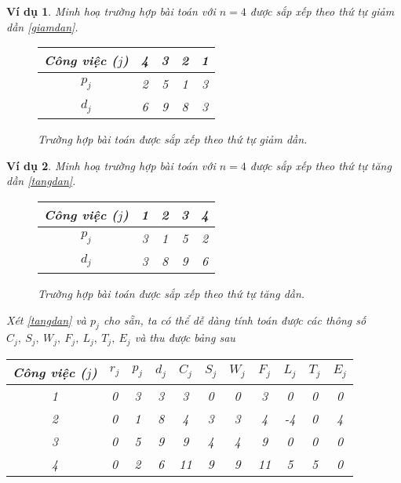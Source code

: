 \documentclass[12pt,a4paper]{report}
\newtheorem{vd}{Ví dụ}
\begin{document}
\begin{vd}
	Minh hoạ trường hợp bài toán với $n=4$ được sắp xếp theo thứ tự giảm dần \eqref{giamdan}.
	
	\begin{figure}[h!]
	\centering
	\begin{tabular}{|c | c c c c |} 
		\hline
		Công việc ($j$) & 4 & 3 & 2 & 1 \\
		\hline\hline
		$p_j$ & 2 & 5 & 1 & 3 \\
		$d_j$ & 6 & 9 & 8 & 3 \\
		\hline
	\end{tabular}
	\caption{\label{giamdan} Trường hợp bài toán được sắp xếp theo thứ tự giảm dần.}
	\end{figure}
\end{vd}
	
\begin{vd}
	Minh hoạ trường hợp bài toán với $n=4$ được sắp xếp theo thứ tự tăng dần \eqref{tangdan}.
	\begin{figure}[h!]
	\centering
	\begin{tabular}{|c | c c c c |} 
		\hline
		Công việc ($j$) & 1 & 2 & 3 & 4 \\
		\hline\hline
		$p_j$ & 3 & 1 & 5 & 2 \\
		$d_j$ & 3 & 8 & 9 & 6 \\
		\hline
	\end{tabular}
	\caption{\label{tangdan} Trường hợp bài toán được sắp xếp theo thứ tự tăng dần.}
	\end{figure}

	Xét \eqref{tangdan} và $p_j$ cho sẵn, ta có thể dễ dàng tính toán được các thông số $C_j, \: S_j, \: W_j, \: F_j, \: L_j, \: T_j, \: E_j$ và thu được bảng sau
\begin{table}[h!]
		\centering
		 \begin{tabular}{|c || c c c c c c c c c c|}
		 \hline
		 Công việc ($j$) & $r_j$ & $p_j$ & $d_j$ & $C_j$ & $S_j$ & $W_j$ & $F_j$ & $L_j$ & $T_j$ & $E_j$ \\
		 \hline
		 1 & 0 & 3 & 3 & 3 & 0 & 0 & 3 & 0 & 0 & 0 \\
		 \hline
		 2 & 0 & 1 & 8 & 4 & 3 & 3 & 4 & -4 & 0 & 4 \\
		 \hline
		 3 & 0 & 5 & 9 & 9 & 4 & 4 & 9 & 0 & 0 & 0 \\
		 \hline
		 4 & 0 & 2 & 6 & 11 & 9 & 9 & 11 & 5 & 5 & 0 \\
		 \hline
		 \end{tabular}
	\end{table}


\end{vd}
\end{document}
